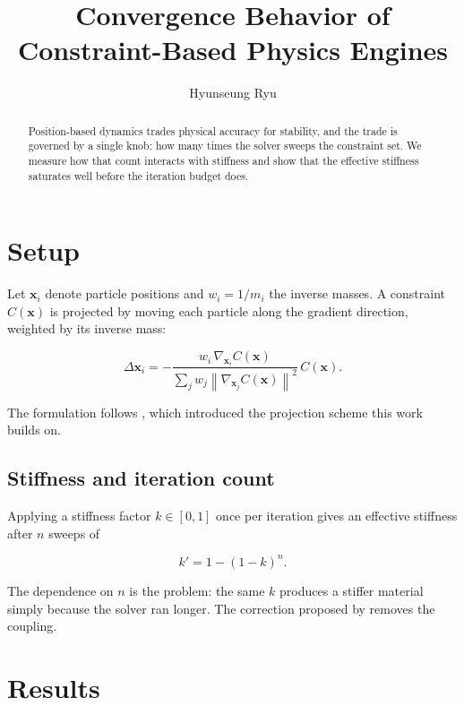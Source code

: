 \documentclass{article}
\title{Convergence Behavior of Constraint-Based Physics Engines}
\author{Hyunseung Ryu}
\begin{document}
\maketitle

\begin{abstract}
Position-based dynamics trades physical accuracy for stability, and the trade is
governed by a single knob: how many times the solver sweeps the constraint set.
We measure how that count interacts with stiffness and show that the effective
stiffness saturates well before the iteration budget does.
\end{abstract}

\section{Setup}

Let $\mathbf{x}_i$ denote particle positions and $w_i = 1/m_i$ the inverse masses.
A constraint $C(\mathbf{x})$ is projected by moving each particle along the
gradient direction, weighted by its inverse mass:

\begin{equation}
  \Delta \mathbf{x}_i = -\frac{w_i \, \nabla_{\mathbf{x}_i} C(\mathbf{x})}
    {\sum_j w_j \left\| \nabla_{\mathbf{x}_j} C(\mathbf{x}) \right\|^2} \, C(\mathbf{x}).
\end{equation}

The formulation follows \cite{muller2007}, which introduced the projection scheme
this work builds on.

\subsection{Stiffness and iteration count}

Applying a stiffness factor $k \in [0, 1]$ once per iteration gives an effective
stiffness after $n$ sweeps of

\begin{equation}
  k' = 1 - (1 - k)^{n}.
\end{equation}

The dependence on $n$ is the problem: the same $k$ produces a stiffer material
simply because the solver ran longer. The correction proposed by \cite{macklin2016}
removes the coupling.

\section{Results}
\end{document}
